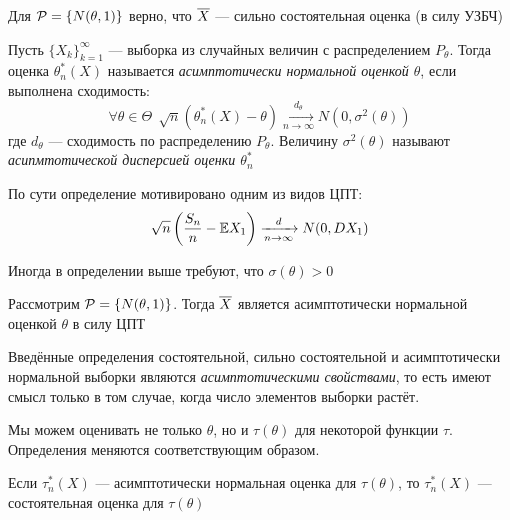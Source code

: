 \begin{example}
	Для $\mathcal{P} = \{N(\theta, 1)\}$ верно, что $\overline{X}$ --- сильно состоятельная оценка (в силу УЗБЧ)
\end{example}

\begin{definition}
	Пусть $\{X_k\}_{k = 1}^\infty$ --- выборка из случайных величин с распределением $P_\theta$. Тогда оценка $\theta_n^*(X)$ называется \textit{асимптотически нормальной оценкой $\theta$}, если выполнена сходимость:
	\[
		\forall \theta \in \Theta\ \ \sqrt{n}(\theta_n^*(X) - \theta) \xrightarrow[n \to \infty]{d_\theta} N(0, \sigma^2(\theta))
	\]
	где $d_\theta$ --- сходимость по распределению $P_\theta$. Величину $\sigma^2(\theta)$ называют \textit{асипмтотической дисперсией оценки $\theta_n^*$}
\end{definition}

\begin{anote}
	По сути определение мотивировано одним из видов ЦПТ:
	\[
		\sqrt{n}\left(\frac{S_n}{n} - \mathbb{E} X_1\right) \xrightarrow[n \to \infty]{d} N(0, DX_1)
	\]
\end{anote}

\begin{note}
	Иногда в определении выше требуют, что $\sigma(\theta) > 0$
\end{note}

\begin{example}
	Рассмотрим $\mathcal{P} = \{N(\theta, 1)\}$. Тогда $\overline{X}$ является асимптотически нормальной оценкой $\theta$ в силу ЦПТ
\end{example}

\begin{note}
	Введённые определения состоятельной, сильно состоятельной и асимптотически нормальной выборки являются \textit{асимптотическими свойствами}, то есть имеют смысл только в том случае, когда число элементов выборки растёт.
\end{note}

\begin{note}
	Мы можем оценивать не только $\theta$, но и $\tau(\theta)$ для некоторой функции $\tau$. Определения меняются соответствующим образом.
\end{note}

\begin{proposition}
	Если $\tau_n^*(X)$ --- асимптотически нормальная оценка для $\tau(\theta)$, то $\tau_n^*(X)$ --- состоятельная оценка для $\tau(\theta)$
\end{proposition}

